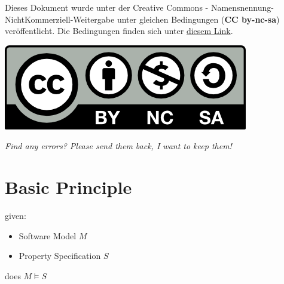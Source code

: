 \documentclass[a4paper, 10pt]{article}
\begin{document}

\begin{shaded}
Dieses Dokument wurde unter der Creative Commons - Namensnennung-NichtKommerziell-Weitergabe unter gleichen Bedingungen (\textbf{CC by-nc-sa}) veröffentlicht. Die Bedingungen finden sich unter \href{http://creativecommons.org/licenses/by-nc-sa/3.0/de}{diesem Link}. \\
\centerline{\includegraphics[]{../cc-by-nc-sa.png}}
\end{shaded}

\textit{\hm \; Find any errors? Please send them back, I want to keep them!}

\section*{Basic Principle}
\begin{multicols}{2}
given:
\begin{itemize}
    \item Software Model $M$
    \item Property Specification $S$
\end{itemize}
does $M\models S$
\columnbreak
\begin{center}
\scalebox{0.75}{}
\end{center}
\end{multicols}
\end{document}
